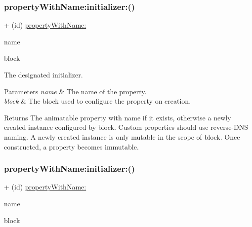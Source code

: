 \subsubsection{\texorpdfstring{property\+With\+Name\+:initializer\+:()}{propertyWithName:initializer:()}\hspace{0.1cm}{\footnotesize\ttfamily [1/3]}}
{\footnotesize\ttfamily + (id) \mbox{\hyperlink{interface_p_o_p_animatable_property_ad11b0dd7ba703f4ba087052ce57c12b4}{property\+With\+Name\+:}} \begin{DoxyParamCaption}\item[{(N\+S\+String $\ast$)}]{name }\item[{initializer:(void($^\wedge$)(\mbox{\hyperlink{interface_p_o_p_mutable_animatable_property}{P\+O\+P\+Mutable\+Animatable\+Property}} $\ast$prop))}]{block }\end{DoxyParamCaption}}

The designated initializer. 
\begin{DoxyParams}{Parameters}
{\em name} & The name of the property. \\
\hline
{\em block} & The block used to configure the property on creation. \\
\hline
\end{DoxyParams}
\begin{DoxyReturn}{Returns}
The animatable property with name if it exists, otherwise a newly created instance configured by block.  Custom properties should use reverse-\/\+D\+NS naming. A newly created instance is only mutable in the scope of block. Once constructed, a property becomes immutable. 
\end{DoxyReturn}
\mbox{\label{interface_p_o_p_animatable_property_aad3690254419e0353ebfa982a22d8c6e}} 
\subsubsection{\texorpdfstring{property\+With\+Name\+:initializer\+:()}{propertyWithName:initializer:()}\hspace{0.1cm}{\footnotesize\ttfamily [2/3]}}
{\footnotesize\ttfamily + (id) \mbox{\hyperlink{interface_p_o_p_animatable_property_ad11b0dd7ba703f4ba087052ce57c12b4}{property\+With\+Name\+:}} \begin{DoxyParamCaption}\item[{(N\+S\+String $\ast$)}]{name }\item[{initializer:(void($^\wedge$)(\mbox{\hyperlink{interface_p_o_p_mutable_animatable_property}{P\+O\+P\+Mutable\+Animatable\+Property}} $\ast$prop))}]{block }\end{DoxyParamCaption}}

